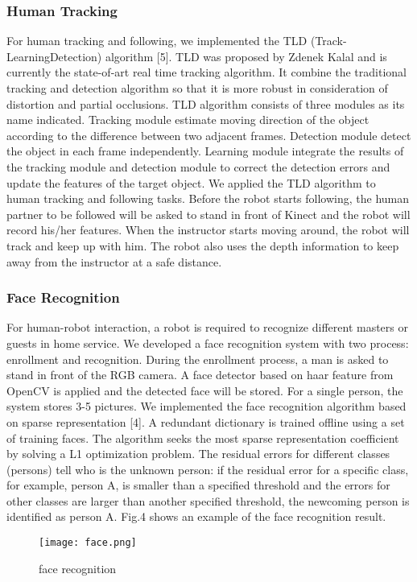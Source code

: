 \subsubsection{Human Tracking}
For human tracking and following, we implemented the TLD (Track-LearningDetection) algorithm [5]. TLD was proposed by Zdenek Kalal and is currently the state-of-art real time tracking algorithm. It combine the traditional tracking and detection algorithm so that it is more robust in consideration of distortion and partial occlusions. TLD algorithm consists of three modules as its name indicated. Tracking module estimate moving direction of the object according to the difference between two adjacent frames. Detection module detect the object in each frame independently. Learning module integrate the results of the tracking module and detection module to correct the detection errors and update the features of the target object.
We applied the TLD algorithm to human tracking and following tasks. Before the robot starts following, the human partner to be followed will be asked to stand in front of Kinect and the robot will record his/her features. When the instructor starts moving around, the robot will track and keep up with him. The robot also uses the depth information to keep away from the instructor at a safe distance.
\subsubsection{Face Recognition}
For human-robot interaction, a robot is required to recognize different masters or guests in home service. We developed a face recognition system with two process: enrollment and recognition. During the enrollment process, a man is asked to stand in front of the RGB camera. A face detector based on haar feature from OpenCV is applied and the detected face will be stored. For a single person, the system stores 3-5 pictures.
We implemented the face recognition algorithm based on sparse representation [4]. A redundant dictionary is trained offline using a set of training faces. The algorithm seeks the most sparse representation coefficient by solving a L1 optimization problem. The residual errors for different classes (persons) tell who is the unknown person: if the residual error for a specific class, for example, person A, is smaller than a specified threshold and the errors for other classes are larger than another specified threshold, the newcoming person is identified as person A. Fig.4 shows an example of the face recognition result.
\begin{figure}[H]
    \texttt{[image: face.png]}
    \caption{face recognition}
\end{figure}
